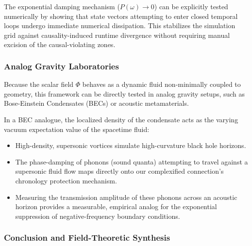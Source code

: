 The exponential damping mechanism (\(P(\omega) \to 0\)) can be
explicitly tested numerically by showing that state vectors attempting
to enter closed temporal loops undergo immediate numerical dissipation.
This stabilizes the simulation grid against causality-induced runtime
divergence without requiring manual excision of the causal-violating
zones.

\subsubsection{Analog Gravity
Laboratories}\label{analog-gravity-laboratories}

Because the scalar field \(\Phi\) behaves as a dynamic fluid
non-minimally coupled to geometry, this framework can be directly tested
in analog gravity setups, such as Bose-Einstein Condensates (BECs) or
acoustic metamaterials.

\begin{Shaded}
\begin{Highlighting}[]
\end{Highlighting}
\end{Shaded}

In a BEC analogue, the localized density of the condensate acts as the
varying vacuum expectation value of the spacetime fluid:

\begin{itemize}
\tightlist
\item
  High-density, supersonic vortices simulate high-curvature black hole
  horizons.
\item
  The phase-damping of phonons (sound quanta) attempting to travel
  against a supersonic fluid flow maps directly onto our complexified
  connection's chronology protection mechanism.
\item
  Measuring the transmission amplitude of these phonons across an
  acoustic horizon provides a measurable, empirical analog for the
  exponential suppression of negative-frequency boundary conditions.
\end{itemize}

\subsubsection{Conclusion and Field-Theoretic
Synthesis}\label{conclusion-and-field-theoretic-synthesis}


